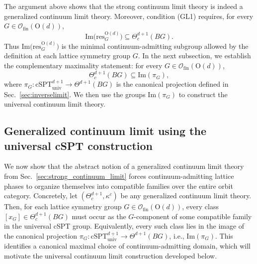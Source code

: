 \documentclass[aps,prx,reprint,superscriptaddress,twocolumn,amsmath,amssymb,amsfonts, nofootinbib]{revtex4-2}
\newcommand{\ofin}{\mathcal{O}_{\text{fin}}}
\newcommand{\res}{\text{res}}
\theoremstyle{apsstyle}
\begin{document}
\bigskip 

The argument above shows that the strong continuum limit theory is indeed a generalized continuum limit theory.  Moreover, condition {\rm(GL1)} requires, for every $G\in\ofin(\mathrm{O}(d))$,
\begin{equation*}
\mathrm{Im}\bigl(\res^{\mathrm{O}(d)}_{G}\bigr) \subseteq \Theta^{d+1}_{c}(BG).
\end{equation*}
Thus $\mathrm{Im}\bigl(\res^{\mathrm{O}(d)}_{G}\bigr)$ is the minimal continuum-admitting subgroup allowed by the definition at each lattice symmetry group $G$. In the next subsection, we establish the complementary maximality statement: 
for every $G\in\ofin(\mathrm{O}(d))$,
\begin{equation*}
\Theta^{d+1}_{c}(BG) \subseteq \mathrm{Im}(\pi_G),
\end{equation*}
where $\pi_G:\mathrm{cSPT}^{d+1}_{\mathrm{univ}} \to\Theta^{d+1}(BG)$ is the canonical projection defined in Sec.~\ref{sec:inverselimit}. We then use the groups $\mathrm{Im}(\pi_G)$ to construct the universal continuum limit theory.


\subsection{Generalized continuum limit using the universal cSPT construction}
\label{sec:inverse_limit_construction}

We now show that the abstract notion of a generalized continuum limit theory from Sec.~\ref{sec:strong_continuum_limit} forces continuum-admitting lattice phases to organize themselves into compatible families over the entire orbit category. Concretely, let $(\Theta^{d+1}_c,\kappa^{c})$ be any generalized continuum limit theory. Then, for each lattice symmetry group $G\in\ofin(\mathrm{O}(d))$, every class $[x_G]\in \Theta^{d+1}_c(BG)$ must occur as the $G$-component of some compatible family in the universal cSPT group. Equivalently, every such class lies in the image of the canonical projection $
\pi_G:\mathrm{cSPT}^{d+1}_{\mathrm{univ}}\to \Theta^{d+1}(BG)$, i.e., $\mathrm{Im}(\pi_{G})$. This identifies a canonical maximal choice of continuum-admitting domain, which will motivate the universal continuum limit construction developed below.

\medskip
\end{document}

